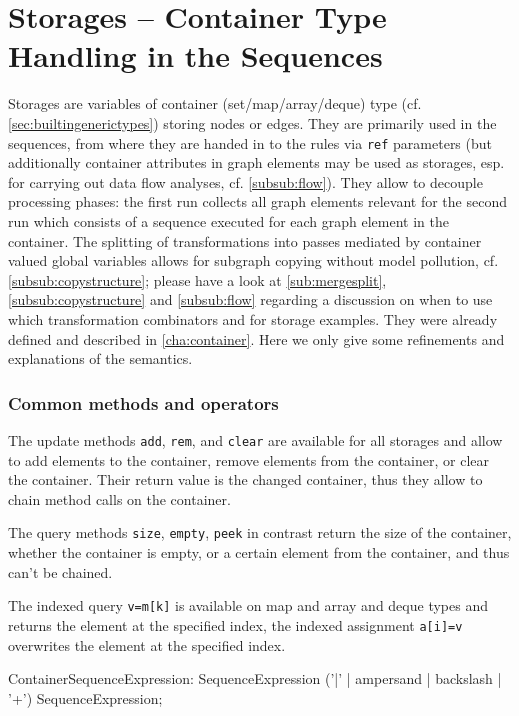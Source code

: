 \section{Storages -- Container Type Handling in the Sequences}\label{sec:storages}
Storages are variables of container (set/map/array/deque) type (cf. \ref{sec:builtingenerictypes}) storing nodes or edges.
They are primarily used in the sequences, from where they are handed in to the rules via \texttt{ref} parameters (but additionally container attributes in graph elements may be used as storages,
esp. for carrying out data flow analyses, cf. \ref{subsub:flow}).
They allow to decouple processing phases: the first run collects all graph elements relevant for the second run which consists of a sequence executed for each graph element in the container.
The splitting of transformations into passes mediated by container valued global variables allows for subgraph copying without model pollution, cf. \ref{subsub:copystructure}; please have a look at \ref{sub:mergesplit}, \ref{subsub:copystructure} and \ref{subsub:flow} regarding a discussion on when to use which transformation combinators and for storage examples.
They were already defined and described in \ref{cha:container}.
Here we only give some refinements and explanations of the semantics.

\subsubsection*{Common methods and operators}

The update methods \texttt{add}, \texttt{rem}, and \texttt{clear} are available for all storages and allow to add elements to the container, remove elements from the container, or clear the container.
Their return value is the changed container, thus they allow to chain method calls on the container.

The query methods \texttt{size}, \texttt{empty}, \texttt{peek} in contrast return the size of the container, whether the container is empty, or a certain element from the container, and thus can't be chained.

The indexed query \texttt{v=m[k]} is available on map and array and deque types and returns the element at the specified index,
the indexed assignment \texttt{a[i]=v} overwrites the element at the specified index.

\begin{rail}
  ContainerSequenceExpression: 
    SequenceExpression ('|' | ampersand | backslash | '+') SequenceExpression;
\end{rail}

